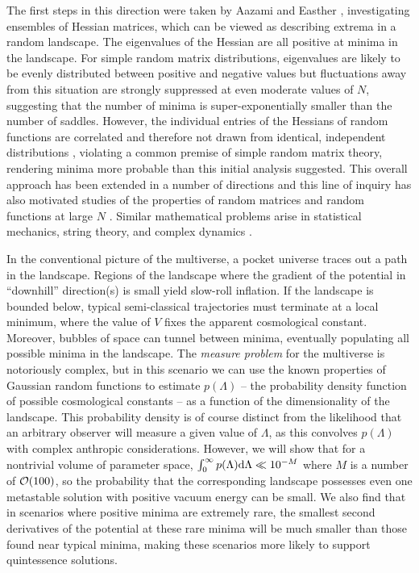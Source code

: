 \documentclass[12pt]{article}
\begin{document}
The first steps in this direction were taken by Aazami and Easther \cite{Aazami2006}, investigating ensembles of Hessian matrices, which can be viewed as describing extrema in a random landscape. The eigenvalues of the Hessian are all positive at minima in the landscape. For simple random matrix distributions, eigenvalues are likely to be evenly distributed between positive and negative values but fluctuations away from this situation are strongly suppressed at even moderate values of $N$, suggesting that the number of minima is super-exponentially smaller than the number of saddles. However, the individual entries of the Hessians of random functions are correlated and therefore not drawn from identical, independent distributions \cite{Battefeld2012,Easther2016}, violating a common premise of simple random matrix theory, rendering minima more probable than this initial analysis suggested.  This overall approach has been  extended in a number of directions \cite{Easther2006, Frazer2011, Henry2009, Marsh2013, Agarwal2011,Yang2012,Masoumi2016,Yamada2018} and this line of inquiry has also motivated studies of the properties of random matrices and random functions at large $N$ \cite{Bray2007,Dean2008,Majumdar2009,Bachlechner2014,Battefeld2012,Fyodorov2013,Masoumi2017}. Similar mathematical problems arise in statistical mechanics, string theory, and complex dynamics \cite{Fyodorov2004,Douglas2004,Douglas2006,Fyodorov2007,Fyodorov2012,Fyodorov2018,Ros2019}.

 
In the conventional picture of the multiverse, a pocket universe traces out a path in the landscape. Regions of the landscape where the gradient of the potential in ``downhill'' direction(s) is small yield slow-roll inflation. If the landscape is bounded below, typical semi-classical trajectories must terminate at a local minimum, where the value of $V$ fixes the apparent cosmological constant. Moreover, bubbles of space can tunnel between minima, eventually populating all possible minima in the landscape.  The {\em measure problem\/} for the multiverse is notoriously complex, but in this scenario we can use the known properties of Gaussian random functions to estimate $p(\Lambda)$ -- the probability density function of possible cosmological constants -- as a function of the dimensionality of the landscape.  This probability density is of course distinct from the likelihood that an arbitrary observer will measure a given value of $\Lambda$, as this convolves $p(\Lambda)$ with complex anthropic considerations. However, we will show that for a nontrivial volume of parameter space,  $\int_0^\infty  p(\Lambda) {\rm d}\Lambda \ll 10^{-M}$  where $M$ is a number of ${\cal{O}}(100)$, so the probability that the corresponding landscape possesses even one metastable solution with positive vacuum energy can be small. We also find that in scenarios where positive minima are extremely rare, the smallest second derivatives of the potential at these rare minima will be much smaller than those found near typical minima, making these scenarios more likely to support quintessence solutions.
\end{document}
